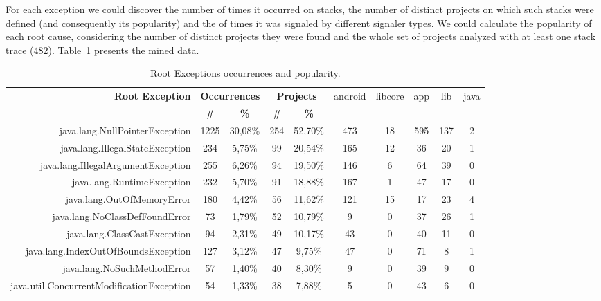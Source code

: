 \documentclass[conference]{IEEEtran}
\begin{document}
For each exception we could discover the number of times it occurred on stacks,
the number of distinct projects on which such stacks were defined (and consequently its
popularity) and the of times it was signaled by different signaler types. We
could calculate the popularity of each root cause, considering the number of
distinct projects they were found and the whole set of projects analyzed with at
least one stack trace (482). Table~\ref{tab:toptenandroid} 
presents the mined data.

\begin{table}
  \centering
  \begin{tabular}{rccccccccc}
    \hline
    \bfseries{Root Exception} &  \multicolumn{2}{c}{\bfseries{Occurrences}} &  \multicolumn{2}{c}{\bfseries{Projects}} & \textsf{android} & \textsf{libcore} & \textsf{app} & \textsf{lib} & \textsf{java} \\
    & \bfseries{\#} &  \bfseries{\%} & \bfseries{\# } & \bfseries{\% } &&&&&\\
    \hline
java.lang.NullPointerException            & 1225 & 30,08\% & 254 & 52,70\% & 473 & 18 & 595 & 137 & 2 \\
java.lang.IllegalStateException           & 234  & 5,75\%  & 99  & 20,54\% & 165 & 12 & 36  & 20  & 1 \\
java.lang.IllegalArgumentException        & 255  & 6,26\%  & 94  & 19,50\% & 146 & 6  & 64  & 39  & 0 \\
java.lang.RuntimeException                & 232  & 5,70\%  & 91  & 18,88\% & 167 & 1  & 47  & 17  & 0 \\
java.lang.OutOfMemoryError                & 180  & 4,42\%  & 56  & 11,62\% & 121 & 15 & 17  & 23  & 4 \\
java.lang.NoClassDefFoundError            & 73   & 1,79\%  & 52  & 10,79\% & 9   & 0  & 37  & 26  & 1 \\
java.lang.ClassCastException              & 94   & 2,31\%  & 49  & 10,17\% & 43  & 0  & 40  & 11  & 0 \\
java.lang.IndexOutOfBoundsException       & 127  & 3,12\%  & 47  & 9,75\%  & 47  & 0  & 71  & 8   & 1 \\
java.lang.NoSuchMethodError               & 57   & 1,40\%  & 40  & 8,30\%  & 9   & 0  & 39  & 9   & 0 \\
java.util.ConcurrentModificationException & 54   & 1,33\%  & 38  & 7,88\%  & 5   & 0  & 43  & 6   & 0 \\

    \hline
  \end{tabular}
\caption{Root Exceptions occurrences and popularity.}
\label{tab:toptenandroid}
\end{table}
\end{document}
